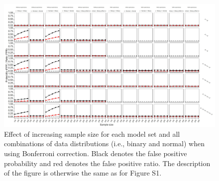 \begin{landscape}
\begin{figure}[hbt!]
\includegraphics[scale=0.75]{R/Analysis/Result/Figures/Figure1DSIBon.jpeg}
\centering
\caption{Effect of increasing sample size for each model set and all combinations of data distributions (i.e., binary and normal) when using Bonferroni correction. Black denotes the false positive probability and red denotes the false positive ratio. The description of the figure is otherwise the same as for Figure S1.}
\label{fig:mainfigure}
\end{figure}
\end{landscape}

